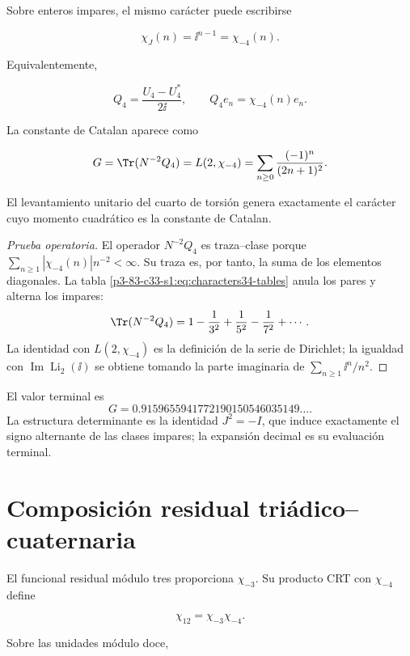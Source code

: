 Sobre enteros impares, el mismo car\'acter puede escribirse

\[
\chi_J(n)=\ii^{n-1}=\chi_{-4}(n).
\]

Equivalentemente,

\begin{equation}
Q_4=\frac{U_4-U_4^*}{2\ii},
\qquad Q_4e_n=\chi_{-4}(n)e_n.
\label{p3-83-c33-s1:eq:Q4}
\end{equation}

La constante de Catalan aparece como

\begin{equation}
G=\Tr(N^{-2}Q_4)=L(2,\chi_{-4})
=\sum_{n\ge0}\frac{(-1)^n}{(2n+1)^2}.
\label{p3-83-c33-s1:eq:catalan}
\end{equation}

El levantamiento unitario del cuarto de torsi\'on genera exactamente el
car\'acter cuyo momento cuadr\'atico es la constante de Catalan.

\begin{proof}[Prueba operatoria]
El operador \(N^{-2}Q_4\) es traza--clase porque
\(\sum_{n\ge1}|\chi_{-4}(n)|n^{-2}<\infty\). Su traza es, por tanto, la
suma de los elementos diagonales. La tabla \cref{p3-83-c33-s1:eq:characters34-tables}
anula los pares y alterna los impares:
\[
\Tr(N^{-2}Q_4)
=1-\frac1{3^2}+\frac1{5^2}-\frac1{7^2}+\cdots.
\]
La identidad con \(L(2,\chi_{-4})\) es la definici\'on de la serie de
Dirichlet; la igualdad con \(\operatorname{Im}\operatorname{Li}_2(\ii)\)
se obtiene tomando la parte imaginaria de
\(\sum_{n\ge1}\ii^n/n^2\).
\end{proof}

El valor terminal es
\[
G=0.9159655941772190150546035149\ldots.
\]
La estructura determinante es la identidad \(J^2=-I\), que induce
exactamente el signo alternante de las clases impares; la expansi\'on decimal
es su evaluaci\'on terminal.

\section{Composici\'on residual tri\'adico--cuaternaria}

El funcional residual m\'odulo tres proporciona \(\chi_{-3}\). Su producto
CRT con \(\chi_{-4}\) define

\begin{equation}
\chi_{12}=\chi_{-3}\chi_{-4}.
\label{p3-83-c33-s1:eq:chi12}
\end{equation}

Sobre las unidades m\'odulo doce,

